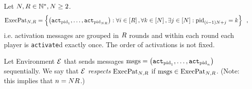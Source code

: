 \begin{definition}
  \label{model:def:execpat}
  Let $N, R \in \mathbb{N}^*, N \geq 2$.
  \begin{equation*}
    \mathrm{ExecPat}_{N, R} = \left\{\left(\mathtt{act}_{\mathrm{pid}_1}, \dots,
    \mathtt{act}_{\mathrm{pid}_{N R}}\right) : \forall i \in
    \left[R\right], \forall k \in
    \left[N\right], \exists j \in \left[N\right]: \mathrm{pid}_{(i -
    1) N + j} = k\right\} \enspace,
  \end{equation*}
  i.e. activation messages are grouped in $R$ rounds and within each round
  each player is \texttt{activate}d exactly once. The order of activations is
  not fixed.

  Let Environment $\mathcal{E}$ that sends messages $\mathrm{msgs} =
  \left(\mathtt{act}_{\mathrm{pid}_1}, \dots, \mathtt{act}_{\mathrm{pid}_n}\right)$
  sequentially. We say that \emph{$\mathcal{E}$ respects $\mathrm{ExecPat}_{N,
  R}$} if $\mathrm{msgs} \in \mathrm{ExecPat}_{N, R}$. (Note: this
  implies that $n = N R$.)
\end{definition}
